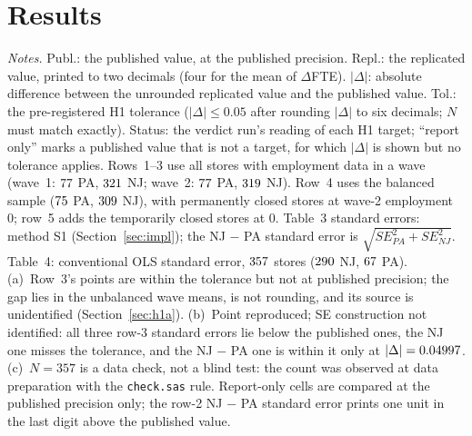 \documentclass[11pt]{article}
\begin{document}
\section{Results}
\label{sec:results}

\begin{table}[tbp]
\centering
\caption{Published and replicated estimates of \citet{card1994minimum}, Table~3 rows~1--5
and Table~4 column~(i). The replication uses the authors' public file (410 stores) and the
sample and variable rules of their \texttt{check.sas}.}
\label{tab:replication}
{\footnotesize\resizebox{\textwidth}{!}{}}
\begin{minipage}{\textwidth}
\footnotesize\smallskip
\emph{Notes.} Publ.: the published value, at the published precision. Repl.: the
replicated value, printed to two decimals (four for the mean of $\Delta$FTE).
$|\Delta|$: absolute difference between the unrounded replicated value and the published
value. Tol.: the pre-registered H1 tolerance ($|\Delta| \le 0.05$ after rounding $|\Delta|$
to six decimals; $N$ must match exactly). Status: the verdict run's reading of each H1
target; ``report only'' marks a published value that is not a target, for which $|\Delta|$
is shown but no tolerance applies. Rows~1--3 use all stores with employment data in a wave
(wave~1: $77$ PA, $321$ NJ; wave~2: $77$ PA, $319$ NJ). Row~4 uses the
balanced sample ($75$ PA, $309$ NJ), with permanently closed stores at wave-2
employment 0; row~5 adds the temporarily closed stores at 0. Table~3 standard errors: method
S1 (Section~\ref{sec:impl}); the NJ $-$ PA standard error is $\sqrt{SE_{PA}^2+SE_{NJ}^2}$.
Table~4: conventional OLS standard error, $357$ stores ($290$ NJ, $67$ PA).
(a)~Row~3's points are within the tolerance but not at published precision; the gap lies
in the unbalanced wave means, is not rounding, and its source is unidentified
(Section~\ref{sec:h1a}). (b)~Point reproduced; SE construction not identified: all three
row-3 standard errors lie below the published ones, the NJ one misses the tolerance, and the
NJ $-$ PA one is within it only at $|\Delta| = 0.04997$. (c)~$N = 357$ is a data
check, not a blind test: the count was observed at data preparation with the
\texttt{check.sas} rule. Report-only cells are compared at the published precision only;
the row-2 NJ $-$ PA standard error prints one unit in the last digit above the published
value.
\end{minipage}
\end{table}
\end{document}
